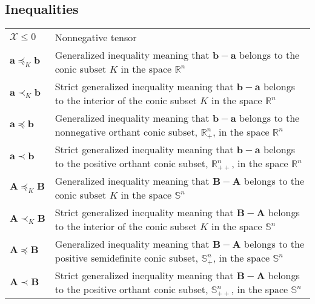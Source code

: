 \documentclass{article}
\begin{document}
\subsection{Inequalities}
\begin{xltabular}{\textwidth}{XX}
    \(\bm{\mathcal{X}} \leq 0\) & Nonnegative tensor\\
    \(\mathbf{a} \preceq_K \mathbf{b}\) & Generalized inequality meaning that \(\mathbf{b}-\mathbf{a}\) belongs to the conic subset \(K\) in the space \(\mathbb{R}^{n}\)\\
    \(\mathbf{a} \prec_K \mathbf{b}\) & Strict generalized inequality meaning that \(\mathbf{b}-\mathbf{a}\) belongs to the interior of the conic subset \(K\) in the space \(\mathbb{R}^{n}\)\\
    \(\mathbf{a} \preceq \mathbf{b}\) & Generalized inequality meaning that \(\mathbf{b}-\mathbf{a}\) belongs to the nonnegative orthant conic subset, \(\mathbb{R}_{+}^{n}\), in the space \(\mathbb{R}^{n}\)\\
    \(\mathbf{a} \prec \mathbf{b}\) & Strict generalized inequality meaning that \(\mathbf{b}-\mathbf{a}\) belongs to the positive orthant conic subset, \(\mathbb{R}_{++}^{n}\), in the space \(\mathbb{R}^{n}\)\\
    \(\mathbf{A} \preceq_K \mathbf{B}\) & Generalized inequality meaning that \(\mathbf{B}-\mathbf{A}\) belongs to the conic subset \(K\) in the space \(\mathbb{S}^{n}\)\\
    \(\mathbf{A} \prec_K \mathbf{B}\) & Strict generalized inequality meaning that \(\mathbf{B}-\mathbf{A}\) belongs to the interior of the conic subset \(K\) in the space \(\mathbb{S}^{n}\)\\
    \(\mathbf{A} \preceq \mathbf{B}\) & Generalized inequality meaning that \(\mathbf{B}-\mathbf{A}\) belongs to the positive semidefinite conic subset, \(\mathbb{S}_{+}^{n}\), in the space \(\mathbb{S}^{n}\)\\
    \(\mathbf{A} \prec \mathbf{B}\) & Strict generalized inequality meaning that \(\mathbf{B}-\mathbf{A}\) belongs to the positive orthant conic subset, \(\mathbb{S}_{++}^{n}\), in the space \(\mathbb{S}^{n}\)
\end{xltabular}
\end{document}
